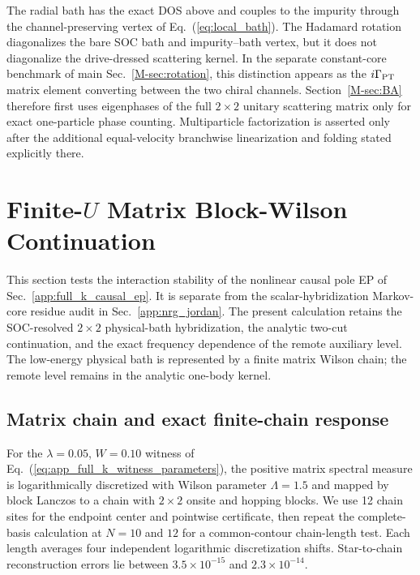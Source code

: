 \documentclass[%
  aps,physrev,onecolumn,10pt,amsmath,amssymb,superscriptaddress,longbibliography,floatfix
]{revtex4-2}
\begin{document}
The radial bath has the exact DOS above and couples to the impurity through
the channel-preserving vertex of Eq.~(\ref{eq:local_bath}).  The Hadamard
rotation diagonalizes the bare SOC bath and impurity--bath vertex, but it
does not diagonalize the drive-dressed scattering kernel.  In the separate
constant-core benchmark of main Sec.~\ref{M-sec:rotation}, this distinction
appears as the $i\Gamma_{\rm PT}$ matrix element converting between the
two chiral channels.  Section~\ref{M-sec:BA} therefore first uses
eigenphases of the full \(2\times2\) unitary scattering matrix only for exact
one-particle phase counting.  Multiparticle factorization is asserted only
after the additional equal-velocity branchwise linearization and folding
stated explicitly there.

\section{Finite-\texorpdfstring{$U$}{U} Matrix Block-Wilson Continuation}
\label{app:finiteU_fullk}

This section tests the interaction stability of the nonlinear causal pole EP
of Sec.~\ref{app:full_k_causal_ep}.  It is separate from the
scalar-hybridization Markov-core residue audit in
Sec.~\ref{app:nrg_jordan}.  The present calculation retains the
SOC-resolved \(2\times2\) physical-bath hybridization, the analytic two-cut
continuation, and the exact frequency dependence of the remote auxiliary
level.  The low-energy physical bath is represented by a finite matrix Wilson
chain; the remote level remains in the analytic one-body kernel.

\subsection{Matrix chain and exact finite-chain response}

For the \(\lambda=0.05\), \(W=0.10\) witness of
Eq.~(\ref{eq:app_full_k_witness_parameters}), the positive matrix spectral
measure is logarithmically discretized with Wilson parameter
\(\Lambda=1.5\) and mapped by block Lanczos to a chain with \(2\times2\)
onsite and hopping blocks.  We use 12 chain sites for the endpoint center and
pointwise certificate, then repeat the complete-basis calculation at $N=10$
and $12$ for a common-contour chain-length test.  Each length averages four
independent logarithmic discretization shifts.  Star-to-chain reconstruction errors lie
between \(3.5\times10^{-15}\) and \(2.3\times10^{-14}\).
\end{document}
